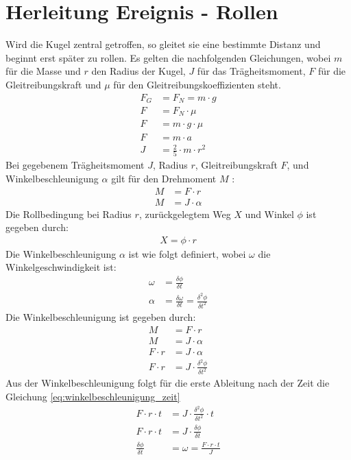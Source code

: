 \section{Herleitung Ereignis - Rollen}\label{anhang:herleitung:event:rollen}
Wird die Kugel zentral getroffen, so gleitet sie eine bestimmte Distanz und beginnt erst später zu rollen\cite{rollzeitpunkt}.
Es gelten die nachfolgenden Gleichungen, wobei $m$ für die Masse und $r$ den Radius der Kugel, $J$ für das
Trägheitsmoment, $F$ für die Gleitreibungskraft und $\mu$ für den Gleitreibungskoeffizienten steht.
\begin{align}
    F_G &= F_N = m \cdot g\\
    F &= F_N \cdot \mu\\
    F &= m \cdot g \cdot \mu\\
    F &= m \cdot a\\
    J &= \frac{2}{5} \cdot m \cdot r^2
\end{align}
Bei gegebenem Trägheitsmoment $J$, Radius $r$, Gleitreibungskraft $F$, und Winkelbeschleunigung $\alpha$ gilt für den Drehmoment $M$ \cite{wiki.drehmoment:1}:
\begin{align}
    M &= F \cdot r\\
    M &= J \cdot \alpha
\end{align}
Die Rollbedingung\cite{wiki.rollen:1} bei Radius $r$, zurückgelegtem Weg $X$ und Winkel $\phi$ ist gegeben durch:
\begin{align}
    X = \phi \cdot r\label{eq:rollbedingung}
\end{align}
Die Winkelbeschleunigung $\alpha$ ist wie folgt definiert\cite{wiki.winkelbeschleunigung:1}, wobei $\omega$ die Winkelgeschwindigkeit ist:
\begin{align}
    \omega &= \frac{\delta \phi}{\delta t}\\
    \alpha &= \frac{\delta \omega}{\delta t} = \frac{\delta^2 \phi}{\delta t^2}
\end{align}
Die Winkelbeschleunigung ist gegeben durch:
\begin{align}
    M &= F \cdot r\\
    M &= J \cdot \alpha\\
    F \cdot r &= J \cdot \alpha\\
    F \cdot r &= J \cdot \frac{\delta^2 \phi}{\delta t^2}
\end{align}
Aus der Winkelbeschleunigung folgt für die erste Ableitung nach der Zeit die Gleichung \ref{eq:winkelbeschleunigung_zeit}
\begin{align}
    F \cdot r \cdot t &= J \cdot \frac{\delta^2 \phi}{\delta t^2} \cdot t\\
    F \cdot r \cdot t &= J \cdot \frac{\delta \phi}{\delta t}\\
    \frac{\delta \phi}{\delta t} &= \omega = \frac{F \cdot r \cdot t}{J}\label{eq:winkelbeschleunigung_zeit}
\end{align}
